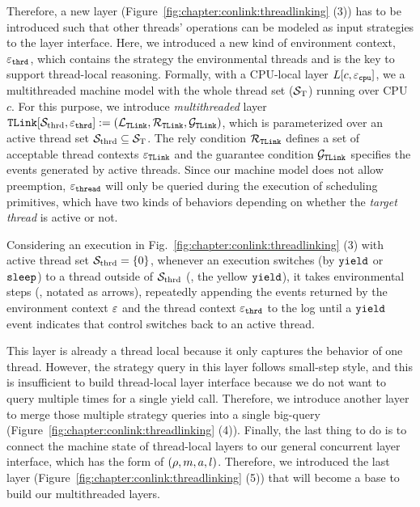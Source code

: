 Therefore,  a new layer (\cf Figure~\ref{fig:chapter:conlink:threadlinking} (3)) has to be introduced such that other 
threads' operations can be modeled as input strategies to the layer interface. 
Here, we introduced a new kind of environment context, ${\varepsilon}_{{\mathrm{\texttt{thrd}}}}$, which contains the strategy the environmental threads and is the key to support  thread-local reasoning.
Formally, with a CPU-local layer  $L[c, {\varepsilon}_{{\mathrm{\texttt{cpu}}}}]$,  we a multithreaded machine model 
with  the whole thread set (${\mathcal{S}_{\mathrm{T}}}$) running over CPU $c$.
For this purpose, we introduce 
 \emph{multithreaded} layer ${{\mathrm{\texttt{TLink}}}}[{\mathcal{S}_{\mathrm{thrd}}}, {{\varepsilon}_{{\mathrm{\texttt{thrd}}}}}] := (\mathcal{L}_{{{\mathrm{\texttt{TLink}}}}},
 \mathcal{R}_{{{\mathrm{\texttt{TLink}}}}}, \mathcal{G}_{{{\mathrm{\texttt{TLink}}}}})$,
which is 
parameterized over an active thread set ${\mathcal{S}_{\mathrm{thrd}}} \subseteq {\mathcal{S}_{\mathrm{T}}}$.
The rely condition $\mathcal{R}_{{{\mathrm{\texttt{TLink}}}}}$ defines a set of acceptable thread contexts
${\varepsilon}_{{{\mathrm{\texttt{TLink}}}}}$ and the guarantee condition $\mathcal{G}_{{{\mathrm{\texttt{TLink}}}}}$ specifies the events generated by active threads. 
Since our machine model does not allow
preemption, ${\varepsilon}_{{\mathrm{\texttt{thread}}}}$ will only be queried during the execution of scheduling primitives, 
which have two kinds
of behaviors  depending on whether the \emph{target
thread} is active or not.

Considering an execution in Fig.~\ref{fig:chapter:conlink:threadlinking} (3) with active thread set
${\mathcal{S}_{\mathrm{thrd}}} = \{0\}$, whenever an execution switches (by ${\mathrm{\texttt{yield}}}$ or ${\mathrm{\texttt{sleep}}}$) 
to a thread outside of ${\mathcal{S}_{\mathrm{thrd}}}$ (\ie, the yellow ${\mathrm{\texttt{yield}}}$),
it takes environmental steps (\ie, notated as arrows), repeatedly appending the 
events returned by the environment context ${\varepsilon}$ and the thread
context ${\varepsilon}_{{\mathrm{\texttt{thrd}}}}$ to the log until a ${\mathrm{\texttt{yield}}}$
event indicates that control switches back to an active thread.


This layer is already a thread local because it only captures the behavior of one thread.
However, the strategy query in this layer follows small-step style, and this is insufficient to build thread-local layer interface because we do not want to query multiple times for a single yield call. 
Therefore, we introduce another  layer to merge those multiple strategy queries into a single big-query (\cf Figure~\ref{fig:chapter:conlink:threadlinking} (4)). 
Finally, the last thing to do is to connect the machine state of thread-local layers to our general concurrent layer interface, which has the form of $(\rho, m, a, l)$.
Therefore, we introduced the last layer (Figure~\ref{fig:chapter:conlink:threadlinking} (5)) that will become a base to build our multithreaded layers.
